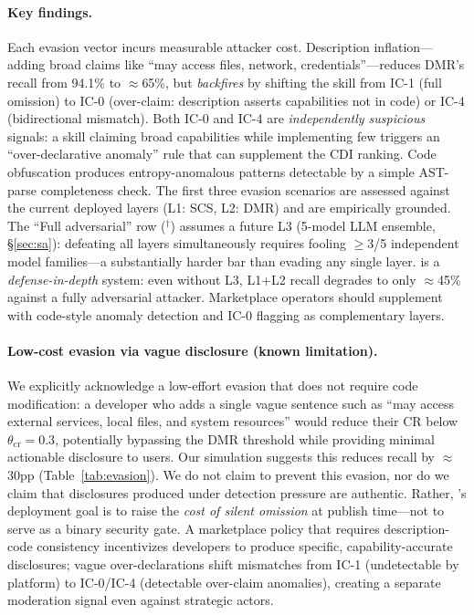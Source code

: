\paragraph{Key findings.}
Each evasion vector incurs measurable attacker cost.
Description inflation---adding broad claims like ``may access files, network,
credentials''---reduces DMR's recall from 94.1\% to $\approx$65\%,
but \emph{backfires} by shifting the skill from IC-1 (full omission) to
IC-0 (over-claim: description asserts capabilities not in code) or IC-4
(bidirectional mismatch). Both IC-0 and IC-4 are \emph{independently suspicious}
signals: a skill claiming broad capabilities while implementing few triggers
an ``over-declarative anomaly'' rule that can supplement the CDI ranking.
Code obfuscation produces entropy-anomalous patterns detectable
by a simple AST-parse completeness check.
The first three evasion scenarios are assessed against the current
deployed layers (L1: SCS, L2: DMR) and are empirically grounded.
The ``Full adversarial'' row ($^\dagger$) assumes a future L3
(5-model LLM ensemble, \S\ref{sec:sa}): defeating all layers
simultaneously requires fooling $\geq$3/5 independent model
families---a substantially harder bar than evading any single layer.
\sysname is a \emph{defense-in-depth} system:
even without L3, L1+L2 recall degrades to only $\approx$45\%
against a fully adversarial attacker.
Marketplace operators should supplement \sysname with
code-style anomaly detection and IC-0 flagging as complementary layers.

\paragraph{Low-cost evasion via vague disclosure (known limitation).}
We explicitly acknowledge a low-effort evasion that does not require
code modification: a developer who adds a single vague sentence
such as ``may access external services, local files, and system resources''
would reduce their CR below $\theta_{\text{cr}}=0.3$,
potentially bypassing the DMR threshold while providing minimal
actionable disclosure to users.
Our simulation suggests this reduces recall by $\approx$30pp (Table~\ref{tab:evasion}).
We do not claim to prevent this evasion, nor do we claim that disclosures
produced under detection pressure are authentic.
Rather, \sysname's deployment goal is to raise the \emph{cost of silent omission}
at publish time---not to serve as a binary security gate.
A marketplace policy that requires description-code consistency
incentivizes developers to produce specific, capability-accurate disclosures;
vague over-declarations shift mismatches from IC-1 (undetectable by platform)
to IC-0/IC-4 (detectable over-claim anomalies), creating a separate
moderation signal even against strategic actors.

